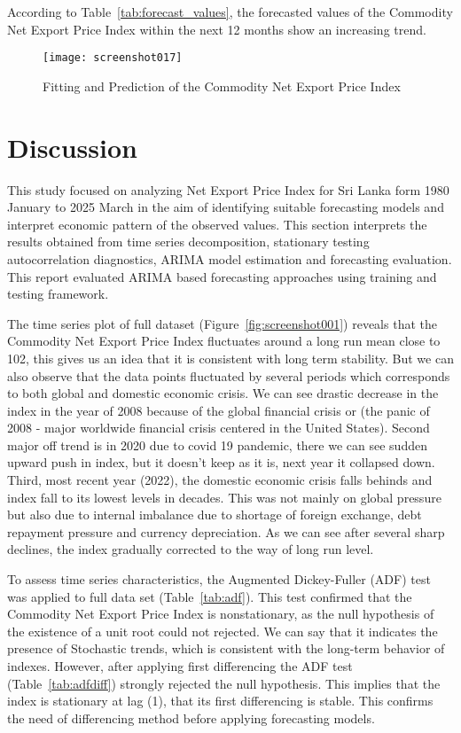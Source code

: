\documentclass[12pt,a4paper]{report} %
\begin{document}
	According to Table~\ref{tab:forecast_values}, the forecasted values of the Commodity Net Export Price Index within the next 12 months show an increasing trend.
	
	\begin{figure}[h!]
		\centering
		\texttt{[image: screenshot017]}
		\caption{Fitting and Prediction of the Commodity Net Export Price Index}
		\label{fig:screenshot017}
	\end{figure}
	
	\setcounter{chapter}{5} %
	
		
		\chapter{Discussion }
		
		This study focused on analyzing Net Export Price Index for Sri Lanka form 1980 January to 2025 March in the aim of identifying suitable forecasting models and interpret economic pattern of the observed values. This section interprets the results obtained from time series decomposition, stationary testing autocorrelation diagnostics, ARIMA model estimation and forecasting evaluation. This report evaluated ARIMA based forecasting approaches using training and testing framework.
		
		The time series plot of full dataset (Figure~\ref{fig:screenshot001})  reveals that the Commodity Net Export Price Index fluctuates around a long run mean close to 102, this gives us an idea that it is consistent with long term stability. But we can also observe that the data points fluctuated by several periods which corresponds to both global and domestic economic crisis. We can see drastic decrease in the index in the year of 2008 because of the global financial crisis or (the panic of 2008 - major worldwide financial crisis centered in the United States). Second major off trend is in 2020 due to covid 19 pandemic, there we can see sudden upward push in index, but it doesn’t keep as it is, next year it collapsed down. Third, most recent year (2022), the domestic economic crisis falls behinds and index fall to its lowest levels in decades. This was not mainly on global pressure but also due to internal imbalance due to shortage of foreign exchange, debt repayment pressure and currency depreciation. As we can see after several sharp declines, the index gradually corrected to the way of long run level.
		
		To assess time series characteristics, the Augmented Dickey-Fuller (ADF) test was applied to full data set (Table~\ref{tab:adf}). This test confirmed that the Commodity Net Export Price Index is nonstationary, as the null hypothesis of the existence of a unit root could not rejected. We can say that it indicates the presence of Stochastic trends, which is consistent with the long-term behavior of indexes. However, after applying first differencing the ADF test (Table~\ref{tab:adfdiff}) strongly rejected the null hypothesis. This implies that the index is stationary at lag (1), that its first differencing is stable. This confirms the need of differencing method before applying forecasting models.
		
\end{document}
